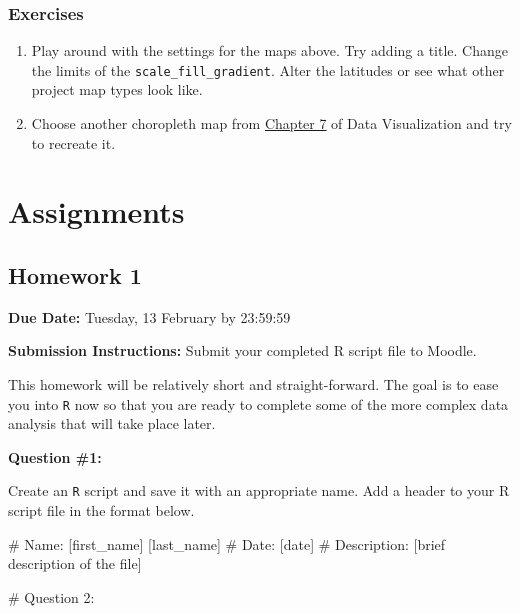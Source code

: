 \documentclass[
  letterpaper,
]{book}
\newenvironment{Shaded}{\begin{snugshade}}{\end{snugshade}}
\newcommand{\CommentTok}[1]{\textcolor[rgb]{0.37,0.37,0.37}{#1}}
\begin{document}
\hypertarget{exercises-3}{%
\section{Exercises}\label{exercises-3}}

\begin{enumerate}
\def\labelenumi{\arabic{enumi}.}
\item
  Play around with the settings for the maps above. Try adding a title.
  Change the limits of the \texttt{scale\_fill\_gradient}. Alter the
  latitudes or see what other project map types look like.
\item
  Choose another choropleth map from
  \href{https://socviz.co/maps.html}{Chapter 7} of Data Visualization
  and try to recreate it.
\end{enumerate}

\part{Assignments}

\hypertarget{homework-1}{%
\chapter*{Homework 1}\label{homework-1}}


\textbf{Due Date:} Tuesday, 13 February by 23:59:59

\textbf{Submission Instructions:} Submit your completed R script file to
Moodle.

This homework will be relatively short and straight-forward. The goal is
to ease you into \texttt{R} now so that you are ready to complete some
of the more complex data analysis that will take place later.

\textbf{Question \#1:}

Create an \texttt{R} script and save it with an appropriate name. Add a
header to your R script file in the format below.

\begin{Shaded}
\begin{Highlighting}[]
\CommentTok{\# Name: [first\_name] [last\_name]}
\CommentTok{\# Date: [date]}
\CommentTok{\# Description: [brief description of the file] }

\CommentTok{\# Question 2:}
\end{Highlighting}
\end{Shaded}
\end{document}
